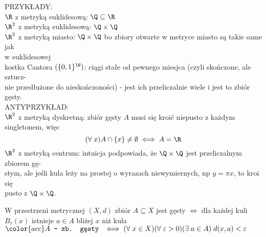 {\large\color{emp}PRZYKŁADY:}\medskip\\
    \indent $\R$ z metryką euklidesową: $\Q\subseteq\R$\medskip\\
    \indent $\R^2$ z metryką euklidesową: $\Q\times\Q$\medskip\\
    \indent $\R^2$ z metryką miasto: $\Q\times\Q$ bo zbiory otwarte w metryce miasto są takie same jak \\w euklidesowej\medskip\\
    \indent kostka Cantora $(\{0,1\}^\N)$: ciągi stałe od pewnego miesjca (czyli skończone, ale sztucz-\\nie przedłużone do nieskończoności) - jest ich przeliczalnie wiele i jest to zbiór gęsty.\bigskip\\
{\large\color{emp}ANTYPRZYKŁAD:}\medskip\\
    \indent $\R^2$ z metryką dyskretną: zbiór gęsty $A$ musi się kroić niepusto z każdym singletonem, więc
    $$(\forall\;x)A\cap \{x\}\neq\emptyset\iff A=\R$$
    \indent $\R^2$ z metryką centrum: intuicja podpowiada, że $\Q\times\Q$ jest przeliczalnym zbiorem gę-\\stym, ale jeśli kula leży na prostej o wyrazach niewymiernych, np $y=\pi x$, to kroi się \\pusto z $\Q\times\Q$.\bigskip

\begin{center}\large
    W przestrzeni metrycznej $(X, d)$ {\color{def}zbiór $A\subseteq X$ jest gęsty} $\iff$ dla każdej kuli $B_r(x)$ istnieje $a\in A$ bliżej $x$ niż kula\smallskip\\
    $\color{acc}A\texttt{ - zb. gęsty }\iff (\forall\;x\in X)(\forall\;\varepsilon>0) (\exists\;a\in A)\; d(x,a)<\varepsilon$
\end{center}\bigskip


